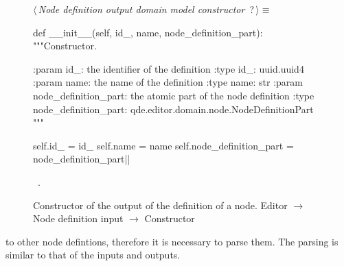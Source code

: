 \documentclass[%
    a4paper,    %
    justified,  %
    nobib,      %
    openany     %
]{tufte-book}
\makeatletter
\renewcommand{\label}[1]{\@tufte@label{##1}}%
\makeatother
\begin{document}
\begin{figure}
\begin{flushleft} \small
\begin{minipage}{\linewidth}\label{scrap139}\raggedright\small
{} $\langle\,${\itshape Node definition output domain model constructor}\nobreak\ {\footnotesize {?}}$\,\rangle\equiv$
\vspace{-1ex}
\begin{pythoncode}
def __init__(self, id_, name, node_definition_part):
    """Constructor.

    :param id_: the identifier of the definition
    :type  id_: uuid.uuid4
    :param name: the name of the definition
    :type  name: str
    :param node_definition_part: the atomic part of the node definition
    :type node_definition_part: qde.editor.domain.node.NodeDefinitionPart
    """

    self.id_                  = id_
    self.name                 = name
    self.node_definition_part = node_definition_part|\NWsep|
\end{pythoncode}
\vspace{1.5ex}
\footnotesize
\begin{list}{}{\setlength{\itemsep}{-\parsep}\setlength{\itemindent}{-\leftmargin}}
\item \NWtxtMacroRefIn\ .

\item{}
\end{list}
\end{minipage}\vspace{4ex}
\end{flushleft}
\caption{Constructor of the output of the definition of a node.
  \newline{}\newline{}Editor $\rightarrow$ Node definition input $\rightarrow$
  Constructor}
\label{editor:lst:node-definition-input:constructor}
\end{figure}

 to other node defintions,
therefore it is necessary to parse them. The parsing is similar to that of the
inputs and outputs.
\end{document}
